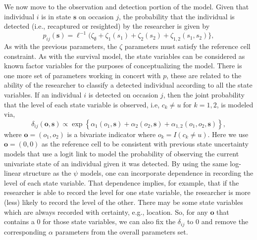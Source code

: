 \documentclass[fleqn]{article}
\newcommand{\bs}{\ensuremath{\mathbf{s}}}
\newcommand{\bo}{\ensuremath{\mathbf{o}}}
\begin{document}
We now move to the observation and detection portion of the model. Given that individual $i$ is in state $\bs$ on occasion $j$, the probability that the individual is detected (i.e., recaptured or resighted) by the researcher is given by
\begin{equation}
p_{ij}(\bs) = \ell^{-1}(\zeta_\emptyset + \zeta_1(s_1) + \zeta_2(s_2) + \zeta_{1,2}(s_1,s_2)\},
\end{equation}
As with the previous parameters, the $\zeta$ parameters must satisfy the reference cell constraint. As with the survival model, the state variables can be considered as known factor variables for the purposes of conceptualizing the model. There is one more set of parameters working in concert with $p$, these are related to the ability of the researcher to classify a detected individual according to all the state variables. If an individual $i$ is detected on occasion $j$, then the joint probability that the level of each state variable is observed, i.e, $c_k \ne u$ for $k=1,2$, is modeled via,
\begin{equation}
\delta_{ij}(\bo,\bs) \propto \exp\left\{\alpha_1(o_1,\bs) + \alpha_2(o_2,\bs) + \alpha_{1,2}(o_1,o_2,\bs)\right\},
\end{equation}
where $\bo = (o_1, o_2)$ is a bivariate indicator where $o_k=I(c_k\ne u)$. Here we use $\bo = (0,0)$ as the reference cell to be consistent with previous state uncertainty models \citep{xxx} that use a logit link to model the probability of observing the current univariate state of an individual given it was detected. By using the same log-linear structure as the $\psi$ models, one can incorporate dependence in recording the level of each state variable. That dependence implies, for example, that if the researcher is able to record the level for one state variable, the researcher is more (less) likely to record the level of the other. There may be some state variables which are always recorded with certainty, e.g., location. So, for any $\bo$ that contains a 0 for those state variables, we can also fix the $\delta_{ij}$ to 0 and remove the corresponding $\alpha$ parameters from the overall parameters set. 
\end{document}
